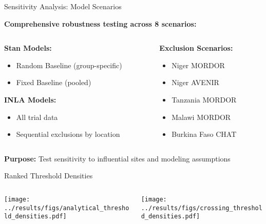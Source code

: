 \documentclass[aspectratio=169]{beamer}\usepackage[]{graphicx}\usepackage[dvipsnames]{xcolor}
\begin{document}
\begin{frame}{Sensitivity Analysis: Model Scenarios}


\textbf{Comprehensive robustness testing across 8 scenarios:}

\begin{columns}
\begin{column}{0.5\textwidth}
\textbf{Stan Models:}
\begin{itemize}
  \item Random Baseline (group-specific)
  \item Fixed Baseline (pooled)
\end{itemize}

\textbf{INLA Models:}
\begin{itemize}
  \item All trial data
  \item Sequential exclusions by location
\end{itemize}
\end{column}
\begin{column}{0.5\textwidth}
\textbf{Exclusion Scenarios:}
\begin{itemize}
  \item Niger MORDOR
  \item Niger AVENIR  
  \item Tanzania MORDOR
  \item Malawi MORDOR
  \item Burkina Faso CHAT
\end{itemize}
\end{column}
\end{columns}

\vspace{0.3cm}
\textbf{Purpose:} Test sensitivity to influential sites and modeling assumptions
\end{frame}

\begin{frame}{Ranked Threshold Densities}
\begin{columns}
\begin{column}{0.5\textwidth}
\begin{center}
\texttt{[image: ../results/figs/analytical\_threshold\_densities.pdf]}
\end{center}
\end{column}
\begin{column}{0.5\textwidth}
\begin{center}
\texttt{[image: ../results/figs/crossing\_threshold\_densities.pdf]}
\end{center}
\end{column}
\end{columns}
\end{frame}
\end{document}
